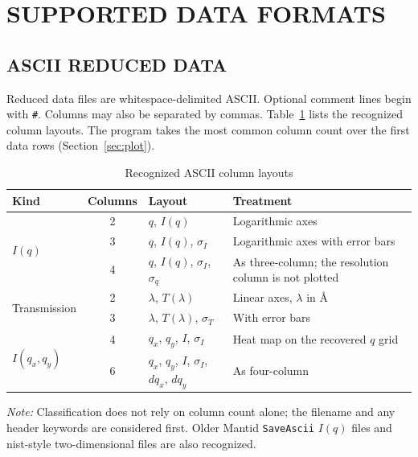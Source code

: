 \documentclass[tm]{ornltm}
\begin{document}
\section{SUPPORTED DATA FORMATS}
\label{sec:formats}

\subsection{ASCII REDUCED DATA}

Reduced data files are whitespace-delimited ASCII. Optional comment lines begin
with \texttt{\#}. Columns may also be separated by commas. Table~\ref{tab:formats}
lists the recognized column layouts. The program takes the most common column
count over the first data rows (Section~\ref{sec:plot}).

\begin{table}[ht]
  \centering
  \begin{threeparttable}
  \caption{Recognized ASCII column layouts}
  \label{tab:formats}
  \small
  \begin{tabular}{l c l p{}}
    \toprule
    Kind & Columns & Layout & Treatment \\
    \midrule
    \multirow{3}{*}{$I(q)$}
      & 2 & $q$, $I(q)$ & Logarithmic axes \\
      & 3 & $q$, $I(q)$, $\sigma_I$ & Logarithmic axes with error bars \\
      & 4 & $q$, $I(q)$, $\sigma_I$, $\sigma_q$ & As three-column; the
        resolution column is not plotted \\
    \midrule
    \multirow{2}{*}{Transmission}
      & 2 & $\lambda$, $T(\lambda)$ & Linear axes, $\lambda$ in \AA \\
      & 3 & $\lambda$, $T(\lambda)$, $\sigma_T$ & With error bars \\
    \midrule
    \multirow{2}{*}{$I(q_x,q_y)$}
      & 4 & $q_x$, $q_y$, $I$, $\sigma_I$ & Heat map on the recovered
        $q$ grid \\
      & 6 & $q_x$, $q_y$, $I$, $\sigma_I$, $dq_x$, $dq_y$ & As four-column \\
    \bottomrule
  \end{tabular}
  \begin{tablenotes}
    \item \emph{Note:} Classification does not rely on column count alone; the
    filename and any header keywords are considered first. Older Mantid
    \texttt{SaveAscii} $I(q)$ files and \ac{nist}-style two-dimensional files
    are also recognized.
  \end{tablenotes}
  \end{threeparttable}
\end{table}
\end{document}
